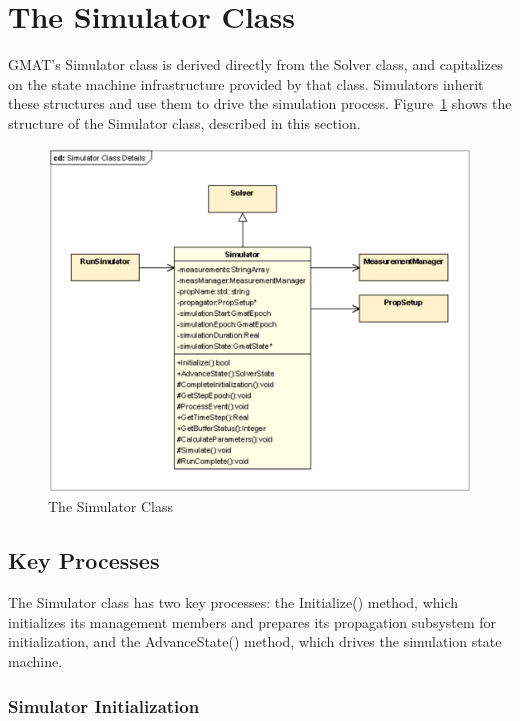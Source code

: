 \section{The Simulator Class}

GMAT's Simulator class is derived directly from the Solver class, and capitalizes on the state machine infrastructure provided by that class.  Simulators inherit these structures and use them to drive the simulation process. Figure~\ref{fig:SimulatorClass} shows the structure of the Simulator class, described in this section.

\begin{figure}[htbp]
\begin{center}
\includegraphics[scale=0.6]{Images/SimulatorClassDetails.eps}
\caption{\label{fig:SimulatorClass}The Simulator Class}
\end{center}
\end{figure}

\subsection{Key Processes}

The Simulator class has two key processes: the Initialize() method, which  initializes its management members and prepares its propagation subsystem for initialization, and the AdvanceState() method, which drives the simulation state machine.

\subsubsection{Simulator Initialization}

